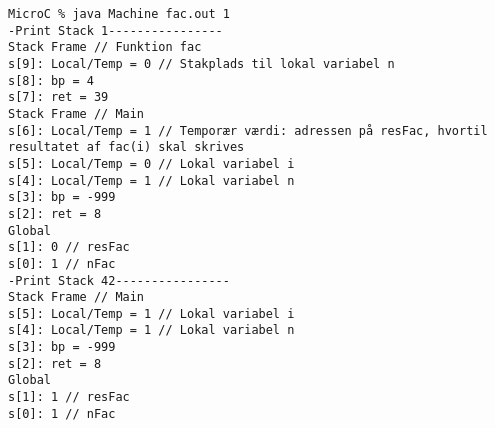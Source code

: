 \begin{verbatim}
MicroC % java Machine fac.out 1
-Print Stack 1----------------
Stack Frame // Funktion fac
s[9]: Local/Temp = 0 // Stakplads til lokal variabel n
s[8]: bp = 4
s[7]: ret = 39
Stack Frame // Main
s[6]: Local/Temp = 1 // Temporær værdi: adressen på resFac, hvortil resultatet af fac(i) skal skrives
s[5]: Local/Temp = 0 // Lokal variabel i
s[4]: Local/Temp = 1 // Lokal variabel n
s[3]: bp = -999
s[2]: ret = 8
Global
s[1]: 0 // resFac
s[0]: 1 // nFac
-Print Stack 42----------------
Stack Frame // Main
s[5]: Local/Temp = 1 // Lokal variabel i
s[4]: Local/Temp = 1 // Lokal variabel n
s[3]: bp = -999
s[2]: ret = 8
Global
s[1]: 1 // resFac
s[0]: 1 // nFac
\end{verbatim}
